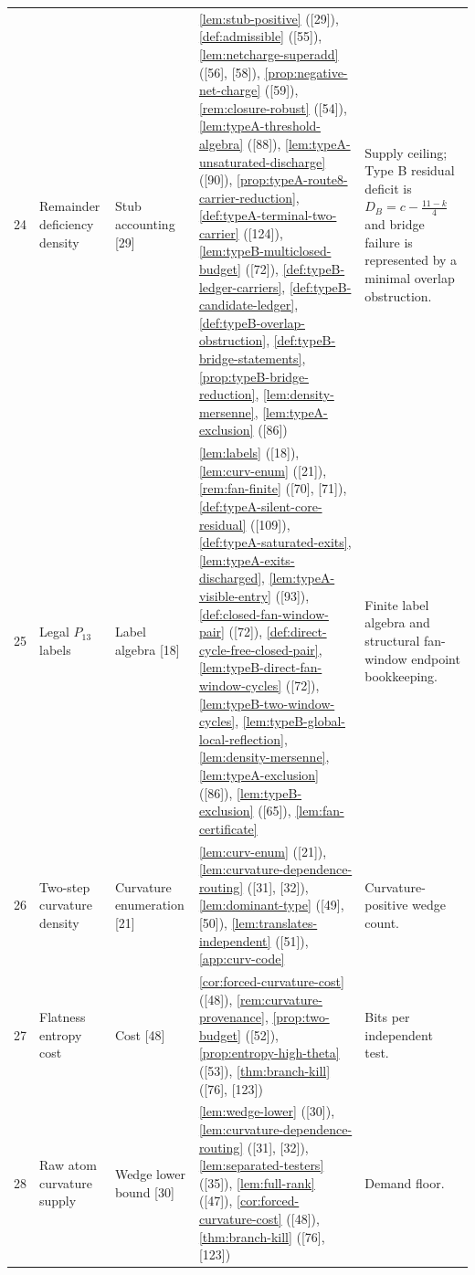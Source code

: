 \documentclass[11pt]{article}
\begin{document}
{\begin{longtable}{C{0.032\textwidth} L{0.145\textwidth} L{0.105\textwidth} L{0.50\textwidth} L{0.155\textwidth}}
24 & Remainder deficiency density & Stub accounting {[29]} & \cref{lem:stub-positive} ([29]), \cref{def:admissible} ([55]), \cref{lem:netcharge-superadd} ([56], [58]), \cref{prop:negative-net-charge} ([59]), \cref{rem:closure-robust} ([54]), \cref{lem:typeA-threshold-algebra} ([88]), \cref{lem:typeA-unsaturated-discharge} ([90]), \cref{prop:typeA-route8-carrier-reduction}, \cref{def:typeA-terminal-two-carrier} ([124]), \cref{lem:typeB-multiclosed-budget} ([72]), \cref{def:typeB-ledger-carriers}, \cref{def:typeB-candidate-ledger}, \cref{def:typeB-overlap-obstruction}, \cref{def:typeB-bridge-statements}, \cref{prop:typeB-bridge-reduction}, \cref{lem:density-mersenne}, \cref{lem:typeA-exclusion} ([86]) & Supply ceiling; Type B residual deficit is $D_B=c-\frac{11-k}{4}$ and bridge failure is represented by a minimal overlap obstruction. \\
25 & Legal $P_{13}$ labels & Label algebra {[18]} & \cref{lem:labels} ([18]), \cref{lem:curv-enum} ([21]), \cref{rem:fan-finite} ([70], [71]), \cref{def:typeA-silent-core-residual} ([109]), \cref{def:typeA-saturated-exits}, \cref{lem:typeA-exits-discharged}, \cref{lem:typeA-visible-entry} ([93]), \cref{def:closed-fan-window-pair} ([72]), \cref{def:direct-cycle-free-closed-pair}, \cref{lem:typeB-direct-fan-window-cycles} ([72]), \cref{lem:typeB-two-window-cycles}, \cref{lem:typeB-global-local-reflection}, \cref{lem:density-mersenne}, \cref{lem:typeA-exclusion} ([86]), \cref{lem:typeB-exclusion} ([65]), \cref{lem:fan-certificate} & Finite label algebra and structural fan-window endpoint bookkeeping. \\
26 & Two-step curvature density & Curvature enumeration {[21]} & \cref{lem:curv-enum} ([21]), \cref{lem:curvature-dependence-routing} ([31], [32]), \cref{lem:dominant-type} ([49], [50]), \cref{lem:translates-independent} ([51]), \cref{app:curv-code} & Curvature-positive wedge count. \\
27 & Flatness entropy cost & Cost {[48]} & \cref{cor:forced-curvature-cost} ([48]), \cref{rem:curvature-provenance}, \cref{prop:two-budget} ([52]), \cref{prop:entropy-high-theta} ([53]), \cref{thm:branch-kill} ([76], [123]) & Bits per independent test. \\
28 & Raw atom curvature supply & Wedge lower bound {[30]} & \cref{lem:wedge-lower} ([30]), \cref{lem:curvature-dependence-routing} ([31], [32]), \cref{lem:separated-testers} ([35]), \cref{lem:full-rank} ([47]), \cref{cor:forced-curvature-cost} ([48]), \cref{thm:branch-kill} ([76], [123]) & Demand floor. \\

\end{longtable}}
\end{document}
